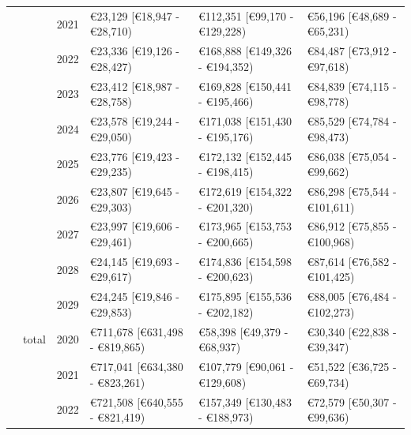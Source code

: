 \documentclass[
]{article}
\begin{document}
\begin{landscape}
\begin{longtable}[t]{llrlll}
\cmidrule{3-6}\nopagebreak
\hspace{1em} &  & 2021 & €23,129 [€18,947 - €28,710) & €112,351 [€99,170 - €129,228) & €56,196 [€48,689 - €65,231)\\
\cmidrule{3-6}\nopagebreak
\hspace{1em} &  & 2022 & €23,336 [€19,126 - €28,427) & €168,888 [€149,326 - €194,352) & €84,487 [€73,912 - €97,618)\\
\cmidrule{3-6}\nopagebreak
\hspace{1em} &  & 2023 & €23,412 [€18,987 - €28,758) & €169,828 [€150,441 - €195,466) & €84,839 [€74,115 - €98,778)\\
\cmidrule{3-6}\nopagebreak
\hspace{1em} &  & 2024 & €23,578 [€19,244 - €29,050) & €171,038 [€151,430 - €195,176) & €85,529 [€74,784 - €98,473)\\
\cmidrule{3-6}\nopagebreak
\hspace{1em} &  & 2025 & €23,776 [€19,423 - €29,235) & €172,132 [€152,445 - €198,415) & €86,038 [€75,054 - €99,662)\\
\cmidrule{3-6}\nopagebreak
\hspace{1em} &  & 2026 & €23,807 [€19,645 - €29,303) & €172,619 [€154,322 - €201,320) & €86,298 [€75,544 - €101,611)\\
\cmidrule{3-6}\nopagebreak
\hspace{1em} &  & 2027 & €23,997 [€19,606 - €29,461) & €173,965 [€153,753 - €200,665) & €86,912 [€75,855 - €100,968)\\
\cmidrule{3-6}\nopagebreak
\hspace{1em} &  & 2028 & €24,145 [€19,693 - €29,617) & €174,836 [€154,598 - €200,623) & €87,614 [€76,582 - €101,425)\\
\cmidrule{3-6}\nopagebreak
\hspace{1em} &  & 2029 & €24,245 [€19,846 - €29,853) & €175,895 [€155,536 - €202,182) & €88,005 [€76,484 - €102,273)\\
\cmidrule{2-6}\nopagebreak
\hspace{1em} & total & 2020 & €711,678 [€631,498 - €819,865) & €58,398 [€49,379 - €68,937) & €30,340 [€22,838 - €39,347)\\
\cmidrule{3-6}\nopagebreak
\hspace{1em} &  & 2021 & €717,041 [€634,380 - €823,261) & €107,779 [€90,061 - €129,608) & €51,522 [€36,725 - €69,734)\\
\cmidrule{3-6}\nopagebreak
\hspace{1em} &  & 2022 & €721,508 [€640,555 - €821,419) & €157,349 [€130,483 - €188,973) & €72,579 [€50,307 - €99,636)\\

\end{longtable}
\end{landscape}
\end{document}

